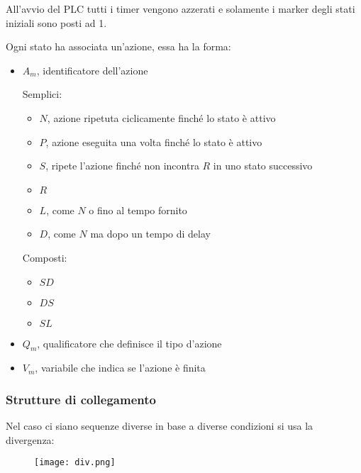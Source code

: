 \documentclass{article}
\begin{document}
\noindent All'avvio del PLC tutti i timer vengono azzerati e solamente i marker degli stati iniziali sono posti ad 1.

\newpage

\noindent Ogni stato ha associata un'azione, essa ha la forma:
\begin{itemize}
    \item $A_m$, identificatore dell'azione

        Semplici:
            \begin{itemize}
                \item $N$, azione ripetuta ciclicamente finché lo stato è attivo
                \item $P$, azione eseguita una volta finché lo stato è attivo
                \item $S$, ripete l'azione finché non incontra $R$ in uno stato successivo
                \item $R$
                \item $L$, come $N$ o fino al tempo fornito
                \item $D$, come $N$ ma dopo un tempo di delay
            \end{itemize}

        Composti:
            \begin{itemize}
                \item $SD$
                \item $DS$
                \item $SL$
            \end{itemize}
        
    \item $Q_m$, qualificatore che definisce il tipo d'azione
    \item $V_m$, variabile che indica se l'azione è finita
\end{itemize}

\subsubsection{Strutture di collegamento}


Nel caso ci siano sequenze diverse in base a diverse condizioni si usa la divergenza:
\begin{figure}[ht]
    \centering
    \texttt{[image: div.png]}
\end{figure}

\vspace{5pt}
\end{document}
